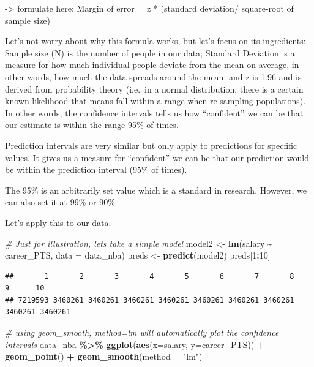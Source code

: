 \documentclass[
]{book}
\newenvironment{Shaded}{\begin{snugshade}}{\end{snugshade}}
\newcommand{\AttributeTok}[1]{\textcolor[rgb]{0.13,0.29,0.53}{#1}}
\newcommand{\CommentTok}[1]{\textcolor[rgb]{0.56,0.35,0.01}{\textit{#1}}}
\newcommand{\DecValTok}[1]{\textcolor[rgb]{0.00,0.00,0.81}{#1}}
\newcommand{\FunctionTok}[1]{\textcolor[rgb]{0.13,0.29,0.53}{\textbf{#1}}}
\newcommand{\NormalTok}[1]{#1}
\newcommand{\OtherTok}[1]{\textcolor[rgb]{0.56,0.35,0.01}{#1}}
\newcommand{\SpecialCharTok}[1]{\textcolor[rgb]{0.81,0.36,0.00}{\textbf{#1}}}
\newcommand{\StringTok}[1]{\textcolor[rgb]{0.31,0.60,0.02}{#1}}
\begin{document}
-\textgreater{} formulate here: Margin of error = z * (standard deviation/ square-root of sample size)

Let's not worry about why this formula works, but let's focus on its ingredients: Sample size (N) is the number of people in our data; Standard Deviation is a measure for how much individual people deviate from the mean on average, in other words, how much the data spreads around the mean. and z is 1.96 and is derived from probability theory (i.e.~in a normal distribution, there is a certain known likelihood that means fall within a range when re-sampling populations). In other words, the confidence intervals tells us how ``confident'' we can be that our estimate is within the range 95\% of times.

Prediction intervals are very similar but only apply to predictions for specfific values. It gives us a measure for ``confident'' we can be that our prediction would be within the prediction interval (95\% of times).

The 95\% is an arbitrarily set value which is a standard in research. However, we can also set it at 99\% or 90\%.

Let's apply this to our data.

\begin{Shaded}
\begin{Highlighting}[]
\CommentTok{\# Just for illustration, let\textquotesingle{}s take a simple model}
\NormalTok{model2 }\OtherTok{\textless{}{-}} \FunctionTok{lm}\NormalTok{(salary }\SpecialCharTok{\textasciitilde{}}\NormalTok{ career\_PTS, }\AttributeTok{data =}\NormalTok{ data\_nba)}
\NormalTok{preds }\OtherTok{\textless{}{-}} \FunctionTok{predict}\NormalTok{(model2)}
\NormalTok{preds[}\DecValTok{1}\SpecialCharTok{:}\DecValTok{10}\NormalTok{]}
\end{Highlighting}
\end{Shaded}

\begin{verbatim}
##       1       2       3       4       5       6       7       8       9      10 
## 7219593 3460261 3460261 3460261 3460261 3460261 3460261 3460261 3460261 3460261
\end{verbatim}

\begin{Shaded}
\begin{Highlighting}[]
\CommentTok{\# using geom\_smooth, method=lm will automatically plot the confidence intervals}
\NormalTok{data\_nba }\SpecialCharTok{\%\textgreater{}\%}
  \FunctionTok{ggplot}\NormalTok{(}\FunctionTok{aes}\NormalTok{(}\AttributeTok{x=}\NormalTok{salary, }\AttributeTok{y=}\NormalTok{career\_PTS)) }\SpecialCharTok{+}
  \FunctionTok{geom\_point}\NormalTok{() }\SpecialCharTok{+}
  \FunctionTok{geom\_smooth}\NormalTok{(}\AttributeTok{method =} \StringTok{"lm"}\NormalTok{)}
\end{Highlighting}
\end{Shaded}
\end{document}

